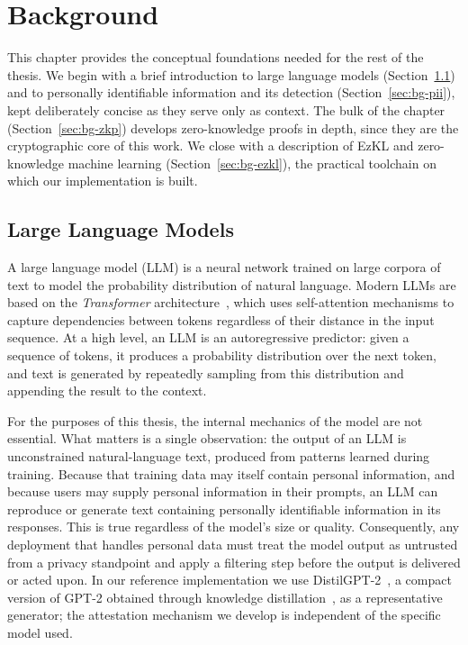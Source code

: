 \chapter{Background}
\label{chap:background}

This chapter provides the conceptual foundations needed for the rest of the thesis. We begin with a brief introduction to large language models (Section~\ref{sec:bg-llms}) and to personally identifiable information and its detection (Section~\ref{sec:bg-pii}), kept deliberately concise as they serve only as context. The bulk of the chapter (Section~\ref{sec:bg-zkp}) develops zero-knowledge proofs in depth, since they are the cryptographic core of this work. We close with a description of EzKL and zero-knowledge machine learning (Section~\ref{sec:bg-ezkl}), the practical toolchain on which our implementation is built.

\section{Large Language Models}
\label{sec:bg-llms}

\begin{sloppypar}
A large language model (LLM) is a neural network trained on large corpora of text to model the probability distribution of natural language. Modern LLMs are based on the \emph{Transformer} architecture~\cite{vaswani2017attention}, which uses self-attention mechanisms to capture dependencies between tokens regardless of their distance in the input sequence. At a high level, an LLM is an autoregressive predictor: given a sequence of tokens, it produces a probability distribution over the next token, and text is generated by repeatedly sampling from this distribution and appending the result to the context.
\end{sloppypar}

\medskip

\begin{sloppypar}
For the purposes of this thesis, the internal mechanics of the model are not essential. What matters is a single observation: the output of an LLM is unconstrained natural-language text, produced from patterns learned during training. Because that training data may itself contain personal information, and because users may supply personal information in their prompts, an LLM can reproduce or generate text containing personally identifiable information in its responses. This is true regardless of the model's size or quality. Consequently, any deployment that handles personal data must treat the model output as untrusted from a privacy standpoint and apply a filtering step before the output is delivered or acted upon. In our reference implementation we use DistilGPT-2~\cite{distilgpt2}, a compact version of GPT-2 obtained through knowledge distillation~\cite{sanh2019distilbert}, as a representative generator; the attestation mechanism we develop is independent of the specific model used.
\end{sloppypar}

